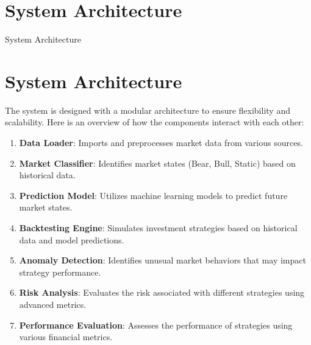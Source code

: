\documentclass[aspectratio=169,xcolor=dvipsnames]{beamer}
\begin{document}
\section{System Architecture}
\begin{frame}{System Architecture}
    
\section{System Architecture}

The system is designed with a modular architecture to ensure flexibility and scalability. Here is an overview of how the components interact with each other:

\begin{enumerate}
\item \textbf{Data Loader}: Imports and preprocesses market data from various sources.
\item \textbf{Market Classifier}: Identifies market states (Bear, Bull, Static) based on historical data.
\item \textbf{Prediction Model}: Utilizes machine learning models to predict future market states.
\item \textbf{Backtesting Engine}: Simulates investment strategies based on historical data and model predictions.
\item \textbf{Anomaly Detection}: Identifies unusual market behaviors that may impact strategy performance.
\item \textbf{Risk Analysis}: Evaluates the risk associated with different strategies using advanced metrics.
\item \textbf{Performance Evaluation}: Assesses the performance of strategies using various financial metrics.
\end{enumerate}
\end{frame}
\end{document}
